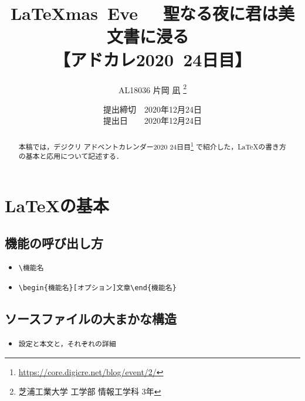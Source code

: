 \documentclass[a4paper]{jsarticle}
\title{
\vspace{-1cm} %
\LaTeX mas\ Eve~ ~聖なる夜に君は美文書に浸る~ \\
【アドカレ2020\ 24日目】}
\author{AL18036 片岡 凪 \thanks{芝浦工業大学 工学部 情報工学科 3年}}
\date{提出締切　2020年12月24日 \\
提出日　　2020年12月24日}
\begin{document}

\maketitle


\setcounter{tocdepth}{2}
\tableofcontents
\newpage


\begin{abstract}
本稿では，デジクリ アドベントカレンダー2020 24日目\footnote{\url{https://core.digicre.net/blog/event/2/}} で紹介した，LaTeXの書き方の基本と応用について記述する．
\end{abstract}


\section{LaTeXの基本}


\subsection{機能の呼び出し方}
\begin{itemize}
\item \verb|\機能名|
\item \verb|\begin{機能名}[オプション]文章\end{機能名}|
\end{itemize}


\subsection{ソースファイルの大まかな構造}
\begin{itemize}
\item \verb|設定と本文と，それぞれの詳細|
\end{itemize}
\end{document}
